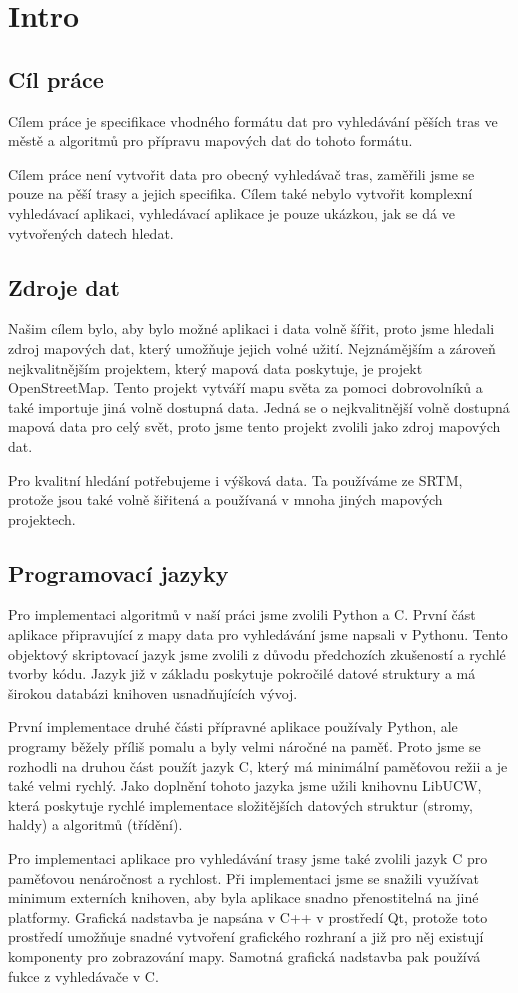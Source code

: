\chapter{Intro}

\section{Cíl práce}
Cílem práce je specifikace vhodného formátu dat pro vyhledávání pěších tras ve
městě a algoritmů pro přípravu mapových dat do tohoto formátu.  

Cílem práce není vytvořit data pro obecný vyhledávač tras, zaměřili jsme se
pouze na pěší trasy a jejich specifika. Cílem také nebylo vytvořit komplexní
vyhledávací aplikaci, vyhledávací aplikace je pouze ukázkou, jak se dá ve
vytvořených datech hledat.

\section{Zdroje dat}
Našim cílem bylo, aby bylo možné aplikaci i data volně šířit, proto jsme hledali
zdroj mapových dat, který umožňuje jejich volné užití. Nejznámějším a zároveň
nejkvalitnějším projektem, který mapová data poskytuje, je projekt
OpenStreetMap. Tento projekt vytváří mapu světa za pomoci dobrovolníků a také
importuje jiná volně dostupná data. Jedná se o nejkvalitnější volně dostupná
mapová data pro celý svět, proto jsme tento projekt zvolili jako zdroj mapových
dat.

Pro kvalitní hledání potřebujeme i výšková data. Ta používáme ze SRTM, protože
jsou také volně šiřitená a používaná v mnoha jiných mapových projektech.


\section{Programovací jazyky}
Pro implementaci algoritmů v naší práci jsme zvolili Python a C. První část
aplikace připravující z mapy data pro vyhledávání jsme napsali v Pythonu. Tento
objektový skriptovací jazyk jsme zvolili z důvodu předchozích zkušeností a
rychlé tvorby kódu. Jazyk již v základu poskytuje pokročilé datové struktury a
má širokou databázi knihoven usnadňujících vývoj. 

První implementace druhé části přípravné aplikace používaly Python, ale programy
běžely příliš pomalu a byly velmi náročné na paměť. Proto jsme se rozhodli na
druhou část použít jazyk C, který má minimální paměťovou režii a je také velmi
rychlý. Jako doplnění tohoto jazyka jsme užili knihovnu LibUCW, která poskytuje
rychlé implementace složitějších datových struktur (stromy, haldy) a algoritmů
(třídění). 

Pro implementaci aplikace pro vyhledávání trasy jsme také zvolili jazyk C pro
paměťovou nenáročnost a rychlost. Při implementaci jsme se snažili využívat
minimum externích knihoven, aby byla aplikace snadno přenostitelná na jiné
platformy. Grafická nadstavba je napsána v C++ v prostředí Qt, protože toto
prostředí umožňuje snadné vytvoření grafického rozhraní a již pro něj existují
komponenty pro zobrazování mapy. Samotná grafická nadstavba pak používá fukce z
vyhledávače v C.

